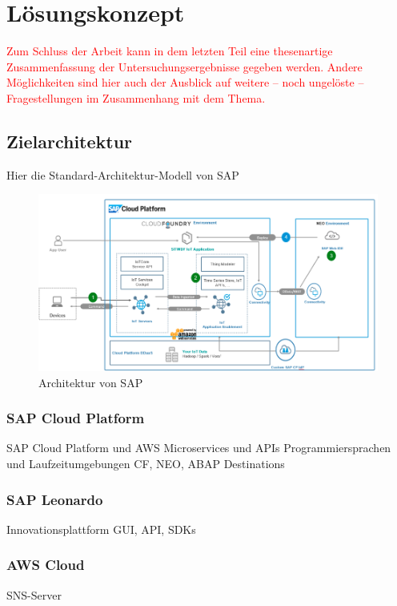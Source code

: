 \section{Lösungskonzept}
\textcolor{red}{Zum Schluss der Arbeit kann in dem letzten Teil eine thesenartige Zusammenfassung der Untersuchungsergebnisse gegeben werden. Andere Möglichkeiten sind hier auch der Ausblick auf weitere – noch ungelöste – Fragestellungen im Zusammenhang mit dem Thema.}

\subsection{Zielarchitektur}
Hier die Standard-Architektur-Modell von SAP


  \begin{figure}[H]
    \centering
    \includegraphics[width=1.0\linewidth]{pictures/sap_architecture}
    \caption[Referenzarchitektur von SAP]{Architektur von SAP \citep{Ganz2019}}
    \label{fig:filename_without_extension}
  \end{figure}


\subsubsection{SAP Cloud Platform}

SAP Cloud Platform und AWS Microservices und APIs
Programmiersprachen und Laufzeitumgebungen
CF, NEO, ABAP
Destinations

\subsubsection{SAP Leonardo}
Innovationsplattform
GUI, API, SDKs
\subsubsection{AWS Cloud}
SNS-Server

